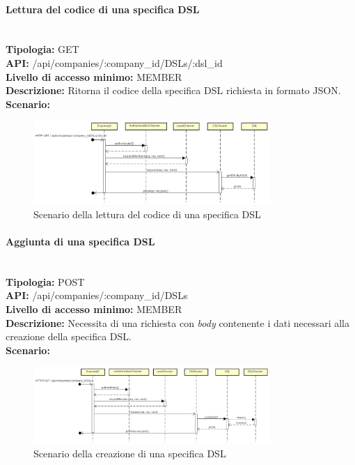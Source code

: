 \newpage
\paragraph{Lettura del codice di una specifica DSL}\mbox{}\\
\textbf{Tipologia:} GET \\
\textbf{API:} /api/companies/:company\_id/DSLs/:dsl\_id \\
\textbf{Livello di accesso minimo:} MEMBER \\
\textbf{Descrizione:} Ritorna il codice della specifica DSL richiesta in formato JSON. \\
\textbf{Scenario:} 
\begin{figure}[H]
\centering
\includegraphics[width=0.8\textwidth]{res/sections/backend/sequence/(GET)dslByID.png}
\caption{Scenario della lettura del codice di una specifica DSL}
\end{figure}

\newpage
\paragraph{Aggiunta di una specifica DSL}\mbox{}\\
\textbf{Tipologia:} POST \\
\textbf{API:} /api/companies/:company\_id/DSLs \\
\textbf{Livello di accesso minimo:} MEMBER \\
\textbf{Descrizione:} Necessita di una richiesta con \textit{body} contenente i dati necessari alla creazione della specifica DSL. \\
\textbf{Scenario:} 
\begin{figure}[H]
\centering
\includegraphics[width=0.8\textwidth]{res/sections/backend/sequence/(POST)dsl.png}
\caption{Scenario della creazione di una specifica DSL}
\end{figure}

